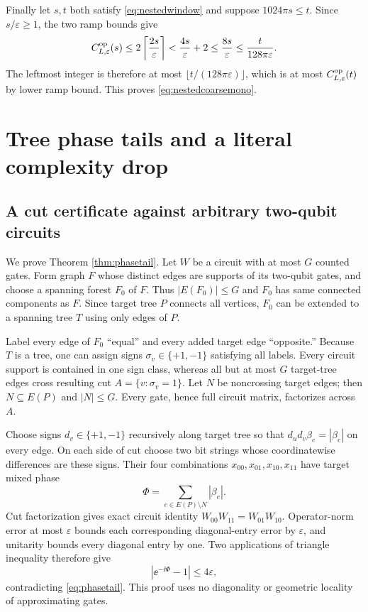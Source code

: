 Finally let $s,t$ both satisfy \eqref{eq:nestedwindow} and suppose
$1024\pi s\le t$.  Since $s/\varepsilon\ge1$, the two ramp bounds give
\[
 C^{\rm op}_{L,\varepsilon}(s)
 \le2\left\lceil\frac{2s}{\varepsilon}\right\rceil
 <\frac{4s}{\varepsilon}+2
 \le\frac{8s}{\varepsilon}
 \le\frac{t}{128\pi\varepsilon}.
\]
The leftmost integer is therefore at most
$\lfloor t/(128\pi\varepsilon)\rfloor$, which is at most
$C^{\rm op}_{L,\varepsilon}(t)$ by lower ramp bound.  This proves
\eqref{eq:nestedcoarsemono}.

\section{Tree phase tails and a literal complexity drop}

\subsection{A cut certificate against arbitrary two-qubit circuits}

We prove Theorem \ref{thm:phasetail}.  Let $W$ be a circuit with at most
$G$ counted gates.  Form graph $F$ whose distinct edges are supports of its
two-qubit gates, and choose a spanning forest $F_0$ of $F$.  Thus
$|E(F_0)|\le G$ and $F_0$ has same connected components as $F$.  Since target
tree $P$ connects all vertices, $F_0$ can be extended to a spanning tree $T$
using only edges of $P$.

Label every edge of $F_0$ ``equal'' and every added target edge ``opposite.''
Because $T$ is a tree, one can assign signs $\sigma_v\in\{+1,-1\}$ satisfying
all labels.  Every circuit support is contained in one sign class, whereas
all but at most $G$ target-tree edges cross resulting cut $A=\{v:\sigma_v=1\}$.
Let $N$ be noncrossing target edges; then $N\subseteq E(P)$ and $|N|\le G$.
Every gate, hence full circuit matrix, factorizes across $A$.

Choose signs $d_v\in\{+1,-1\}$ recursively along target tree so that
$d_ud_v\beta_e=|\beta_e|$ on every edge.  On each side of cut choose two bit
strings whose coordinatewise differences are these signs.  Their four
combinations $x_{00},x_{01},x_{10},x_{11}$ have target mixed phase
\[
 \Phi=\sum_{e\in E(P)\setminus N}|\beta_e|.
\]
Cut factorization gives exact circuit identity
$W_{00}W_{11}=W_{01}W_{10}$.  Operator-norm error at most $\varepsilon$
bounds each corresponding diagonal-entry error by $\varepsilon$, and
unitarity bounds every diagonal entry by one.  Two applications of triangle
inequality therefore give
\[
 \left|\ee^{-\ii\Phi}-1\right|\le4\varepsilon,
\]
contradicting \eqref{eq:phasetail}.  This proof uses no diagonality or
geometric locality of approximating gates.

